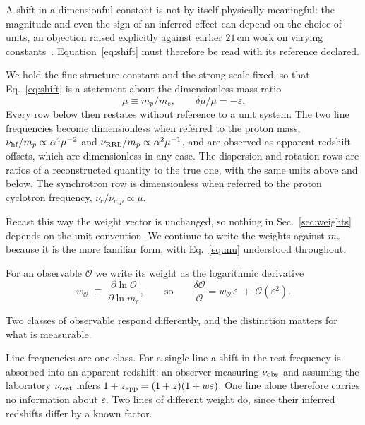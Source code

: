 \documentclass[aps,prd,twocolumn,superscriptaddress,nofootinbib,10pt]{revtex4-2}
\begin{document}
A shift in a dimensionful constant is not by itself physically meaningful: the magnitude and even
the sign of an inferred effect can depend on the choice of units, an objection raised explicitly
against earlier $21\,$cm work on varying constants~\cite{FlambaumPorsev2010,KhatriWandelt2007,
KhatriWandelt2010}. Equation~\eqref{eq:shift} must therefore be read with its reference declared.

We hold the fine-structure constant and the strong scale fixed, so that Eq.~\eqref{eq:shift} is a
statement about the dimensionless mass ratio
%
\begin{equation}
  \mu \equiv m_p/m_e, \qquad \delta\mu/\mu = -\varepsilon .
  \label{eq:mu}
\end{equation}
%
Every row below then restates without reference to a unit system. The two line frequencies become
dimensionless when referred to the proton mass, $\nu_{\rm hf}/m_p \propto \alpha^{4}\mu^{-2}$ and
$\nu_{\rm RRL}/m_p \propto \alpha^{2}\mu^{-1}$, and are observed as apparent redshift offsets, which
are dimensionless in any case. The dispersion and rotation rows are ratios of a reconstructed
quantity to the true one, with the same units above and below. The synchrotron row is dimensionless
when referred to the proton cyclotron frequency, $\nu_c/\nu_{c,p} \propto \mu$.

Recast this way the weight vector is unchanged, so nothing in Sec.~\ref{sec:weights} depends on the
unit convention. We continue to write the weights against $m_e$ because it is the more familiar
form, with Eq.~\eqref{eq:mu} understood throughout.

For an observable $\mathcal{O}$ we write its weight as the logarithmic derivative
%
\begin{equation}
  w_{\mathcal{O}} \;\equiv\; \frac{\partial \ln \mathcal{O}}{\partial \ln m_e},
  \qquad\text{so}\qquad
  \frac{\delta \mathcal{O}}{\mathcal{O}} = w_{\mathcal{O}}\,\varepsilon
  \;+\; \mathcal{O}(\varepsilon^2).
  \label{eq:weight}
\end{equation}

Two classes of observable respond differently, and the distinction matters for what is measurable.

Line frequencies are one class. For a single line a shift in the rest frequency is absorbed into
an apparent redshift: an observer measuring $\nu_{\rm obs}$ and assuming the laboratory
$\nu_{\rm rest}$ infers $1+z_{\rm app} = (1+z)(1+w\varepsilon)$. One line alone therefore carries
no information about $\varepsilon$. Two lines of different weight do, since their inferred
redshifts differ by a known factor.
\end{document}

